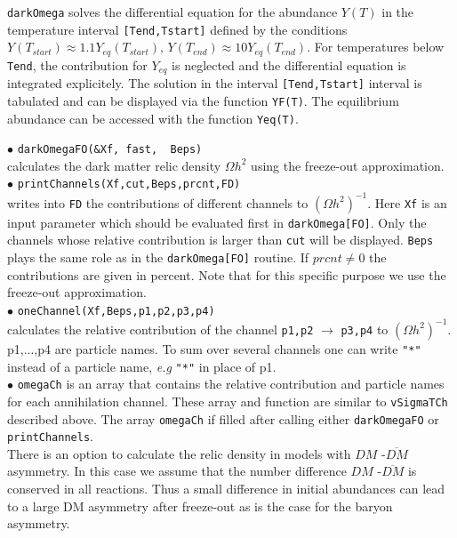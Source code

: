 \documentclass[12pt,a4paper]{article}
\begin{document}
   
\verb|darkOmega| solves the differential equation for the abundance $Y(T)$   in the 
temperature interval {\tt [Tend,Tstart]}  defined by the
conditions $Y(T_{start})\approx 1.1Y_{eq}(T_{start})$,
$Y(T_{end})\approx10Y_{eq}(T_{end})$.  For temperatures below {\tt Tend}, the contribution for  $Y_{eq}$
 is neglected and  the differential equation is integrated
explicitely. The solution in the interval {\tt [Tend,Tstart]}  interval is tabulated and can be displayed  via the
function {\tt YF(T)}. The equilibrium abundance can be accessed  with the function
{\tt Yeq(T)}. 

\noindent
$\bullet$ \verb|darkOmegaFO(&Xf, fast,  Beps)|\\
calculates the  dark matter relic density $\Omega h^2$ using the freeze-out approximation.\\
\noindent
$\bullet$ \verb|printChannels(Xf,cut,Beps,prcnt,FD)|\\   
writes into \verb|FD| the  contributions  of different channels to $(\Omega
h^2)^{-1}$. Here \verb|Xf| is an input parameter which should
be  evaluated first in \verb|darkOmega[FO]|. Only  the channels whose
relative contribution is larger than  \verb|cut| will be displayed. \verb|Beps|
plays the same role as in the \verb|darkOmega[FO]| routine.
If $prcnt\ne 0$ the contributions are given in percent.
Note that  for this specific purpose  we use the
freeze-out approximation.\\
$\bullet$ \verb|oneChannel(Xf,Beps,p1,p2,p3,p4)|\\   
calculates the relative   contribution of the  channel \verb|p1,p2| $\to$ \verb|p3,p4|
to $(\Omega h^2)^{-1}$. p1,...,p4 are particle names.  To 
sum over several channels one can write  \verb|"*"| instead 
of  a particle name, {\it e.g} \verb|"*"| in place of p1.\\
\noindent
$\bullet$ \verb|omegaCh| is an array that contains the relative contribution and particle names for each
annihilation channel. These array and function
are similar to {\tt vSigmaTCh} described above. The array {\tt omegaCh} if filled after calling either
{\tt darkOmegaFO} or {\tt printChannels}. \\

There is an option to calculate the relic density in  models with  $DM$ -$\overline{DM}$ asymmetry.  
In this case we assume that the  number difference   $DM$ -$\overline{DM}$ is conserved in all reactions.
Thus a small difference in initial abundances can lead to a  large DM asymmetry after freeze-out as is the case for the  baryon
asymmetry.\\
\end{document}
